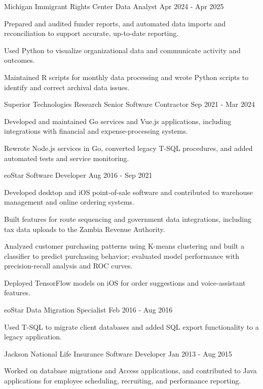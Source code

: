 \documentclass{../styles/cv}
\begin{document}
\subsectionpositiondate
    {Michigan Immigrant Rights Center}
    {Data Analyst}
    {Apr 2024 - Apr 2025}
\resumesublistbegin
    \item Prepared and audited funder reports, and automated data imports and reconciliation to support accurate, up-to-date reporting.
    \item Used Python to visualize organizational data and communicate activity and outcomes.
    \item Maintained R scripts for monthly data processing and wrote Python scripts to identify and correct archival data issues.
\resumesublistend

\subsectionpositiondate
    {Superior Technologies Research}
    {Senior Software Contractor}
    {Sep 2021 - Mar 2024}
\resumesublistbegin
    \item Developed and maintained Go services and Vue.js applications, including integrations with financial and expense-processing systems.
    \item Rewrote Node.js services in Go, converted legacy T-SQL procedures, and added automated tests and service monitoring.
\resumesublistend

\subsectionpositiondate
    {eoStar}
    {Software Developer}
    {Aug 2016 - Sep 2021}
\resumesublistbegin
    \item Developed desktop and iOS point-of-sale software and contributed to warehouse management and online ordering systems.
    \item Built features for route sequencing and government data integrations, including tax data uploads to the Zambia Revenue Authority.
    \item Analyzed customer purchasing patterns using K-means clustering and built a classifier to predict purchasing behavior; evaluated model performance with precision-recall analysis and ROC curves.
    \item Deployed TensorFlow models on iOS for order suggestions and voice-assistant features.
\resumesublistend

\subsectionpositiondate
    {eoStar}
    {Data Migration Specialist}
    {Feb 2016 - Aug 2016}
\resumesublistbegin
    \item Used T-SQL to migrate client databases and added SQL export functionality to a legacy \cpp application.
\resumesublistend

\subsectionpositiondate
    {Jackson National Life Insurance}
    {Software Developer}
    {Jan 2013 - Aug 2015}
\resumesublistbegin
    \item Worked on database migrations and Access applications, and contributed to Java applications for employee scheduling, recruiting, and performance reporting.
\resumesublistend
\end{document}
